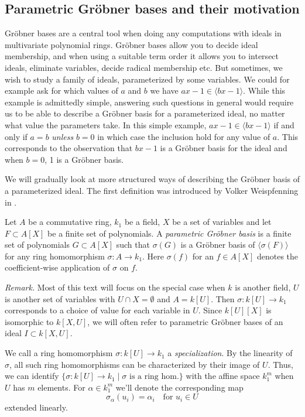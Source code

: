 \documentclass[a4paper, 12pt]{article}
\theoremstyle{changedot}
\theoremstyle{changedotbreak}
\theoremstyle{nonumberplain}
\begin{document}
\subsection{Parametric Gröbner bases and their motivation}
Gröbner bases are a central tool when doing any computations with ideals in multivariate polynomial rings. Gröbner bases allow you to decide ideal membership, and when using a suitable term order it allows you to intersect ideals, eliminate variables, decide radical membership etc. But sometimes, we wish to study a family of ideals, parameterized by some variables. We could for example ask for which values of $a$ and $b$ we have $ax - 1 \in \langle bx - 1 \rangle$. While this example is admittedly simple, answering such questions in general would require us to be able to describe a Gröbner basis for a parameterized ideal, no matter what value the parameters take. In this simple example, $ax - 1 \in \langle bx - 1 \rangle$ if and only if $a = b$ \textit{unless} $b = 0$ in which case the inclusion hold for any value of $a$. This corresponds to the observation that $bx - 1$ is a Gröbner basis for the ideal and when $b=0$, 1 is a Gröbner basis.

We will gradually look at more structured ways of describing the Gröbner basis of a parameterized ideal. The first definition was introduced by Volker Weispfenning in \cite{Weispfenning}.

\begin{definition}\label{def:par_grb}
  Let $A$ be a commutative ring, $k_{1}$ be a field, $X$ be a set of variables and let $F \subset A[X]$ be a finite set of polynomials. A \textit{parametric Gröbner basis} is a finite set of polynomials $G \subset A[X]$ such that $\sigma(G)$ is a Gröbner basis of $\langle \sigma(F) \rangle$ for any ring homomorphism $\sigma : A \to k_{1}$. Here $\sigma(f)$ for an $f \in A[X]$ denotes the coefficient-wise application of $\sigma$ on $f$.
\end{definition}
\textit{Remark. }Most of this text will focus on the special case when $k$ is another field, $U$ is another set of variables with $U \cap X = \emptyset$ and $A = k[U]$. Then $\sigma : k[U] \to k_{1}$ corresponds to a choice of value for each variable in $U$. Since $k[U][X]$ is isomorphic to $k[X, U]$, we will often refer to parametric Gröbner bases of an ideal $I \subset k[X, U]$.

We call a ring homomorphism $\sigma : k[U] \to k_{1}$ a \textit{specialization}. By the linearity of $\sigma$, all such ring homomorphisms can be characterized by their image of $U$. Thus, we can identify $\{\sigma : k[U] \to k_{1} \mid \sigma \text{ is a ring hom.}\}$ with the affine space $k_{1}^{m}$ when $U$ has $m$ elements. For $\alpha \in k_{1}^{m}$ we'll denote the corresponding map
\[\sigma_{\alpha}(u_{i}) = \alpha_{i} \quad \text{for $u_{i} \in U$}\] extended linearly.
\end{document}
